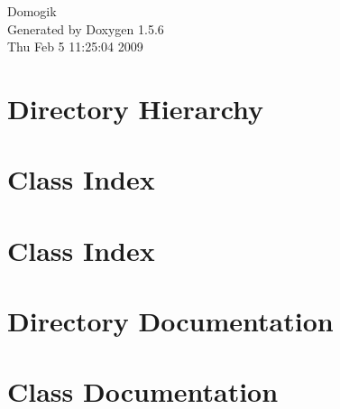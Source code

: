 \documentclass[a4paper]{book}
\begin{document}
\begin{titlepage}
\vspace*{7cm}
\begin{center}
{\Large Domogik }\\
\vspace*{1cm}
{\large Generated by Doxygen 1.5.6}\\
\vspace*{0.5cm}
{\small Thu Feb 5 11:25:04 2009}\\
\end{center}
\end{titlepage}
\clearemptydoublepage
{}
\tableofcontents
\clearemptydoublepage
{}
\chapter{Directory Hierarchy}

\chapter{Class Index}

\chapter{Class Index}

\chapter{Directory Documentation}



\chapter{Class Documentation}



























\printindex
\end{document}
